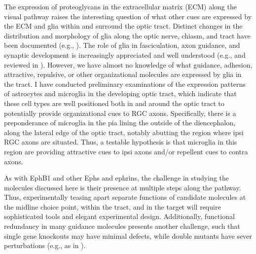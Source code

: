 The expression of proteoglycans in the extracellular matrix (ECM) along the visual pathway \cite{mcadams1995expression,ichijo2006restricted} raises the interesting question of what other cues are expressed by the ECM and glia within and surround the optic tract.
Distinct changes in the distribution and morphology of glia along the optic nerve, chiasm, and tract have been documented (e.g., ).
The role of glia in fasciculation, axon guidance, and synaptic development is increasingly appreciated and well understood (e.g.,  and reviewed in ).
However, we have almost no knowledge of what guidance, adhesion, attractive, repulsive, or other organizational molecules are expressed by glia in the tract.
I have conducted preliminary examinations of the expression patterns of astrocytes and microglia in the developing optic tract, which indicate that these cell types are well positioned both in and around the optic tract to potentially provide organizational cues to RGC axons.
Specifically, there is a preponderance of microglia in the pia lining the outside of the diencephalon, along the lateral edge of the optic tract, notably abutting the region where ipsi RGC axons are situated.
Thus, a testable hypothesis is that microglia in this region are providing attractive cues to ipsi axons and/or repellent cues to contra axons.

As with EphB1 and other Ephs and ephrins, the challenge in studying the molecules discussed here is their presence at multiple steps along the pathway.
Thus, experimentally teasing apart separate functions of candidate molecules at the midline choice point, within the tract, and in the target will require sophisticated tools and elegant experimental design.
Additionally, functional redundancy in many guidance molecules presents another challenge, such that single gene knockouts may have minimal defects, while double mutants have sever perturbations (e.g., as in ).